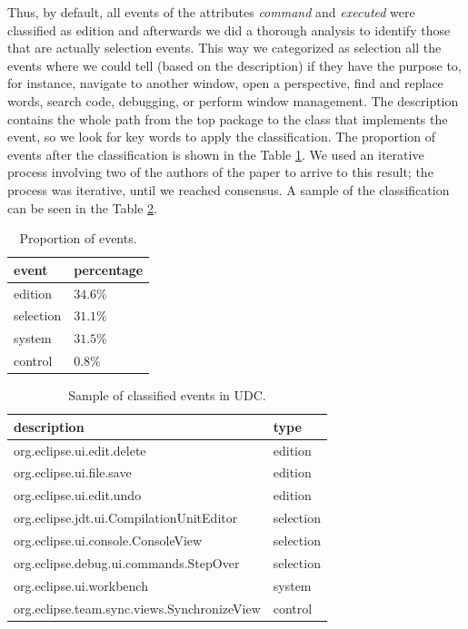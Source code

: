 \documentclass[times]{smrauth}
\begin{document}
Thus, by default, all events of the attributes \textit{command} and \textit{executed} were classified as edition and afterwards we did a thorough analysis to identify those that are actually selection events. This way we categorized as selection all the events where we could tell (based on the description) if they have the purpose to, for instance, navigate to another window, open a perspective, find and replace words, search code, debugging, or perform window management. The description contains the whole path from the top package to the class that implements the event, so we look for key words to apply the classification. The proportion of events after the classification is shown in the Table \ref{tbl:prop_events_udc}.
We used an iterative process involving two of the authors of the paper to arrive to this result; the process was iterative, until we reached consensus. A sample of the classification can be seen in the Table \ref{tbl:ej_events_udc}.

\begin{table}[ht!]
	\small
	\renewcommand{\arraystretch}{1.3}
	\caption{Proportion of events. }
	\label{tbl:prop_events_udc}
	\centering
	\begin{tabular}{|p{1.7cm}|p{2 cm}|} 
		\hline 
		event & percentage \\  
		\hline 
		\hline 
		edition &  $34.6\%$  \\
		selection & $31.1\%$ \\
		system & $31.5\%$  \\
		control & $0.8\%$  \\
		\hline
	\end{tabular}
\end{table}

\begin{table}[ht!]
	\small
	\renewcommand{\arraystretch}{1.3}
	\caption{Sample of classified events in UDC. }
	\label{tbl:ej_events_udc}
	\centering
	\begin{tabular}{|p{6cm}| p{2 cm} |} 
		\hline 
		description & type \\  
		\hline 
		\hline 
		org.eclipse.ui.edit.delete & edition \\
		org.eclipse.ui.file.save & edition \\
		org.eclipse.ui.edit.undo & edition \\
		org.eclipse.jdt.ui.CompilationUnitEditor & selection \\
		org.eclipse.ui.console.ConsoleView & selection \\
		org.eclipse.debug.ui.commands.StepOver & selection \\ 
		org.eclipse.ui.workbench & system \\
		org.eclipse.team.sync.views.SynchronizeView & control \\
		\hline
	\end{tabular}
\end{table}
\end{document}
